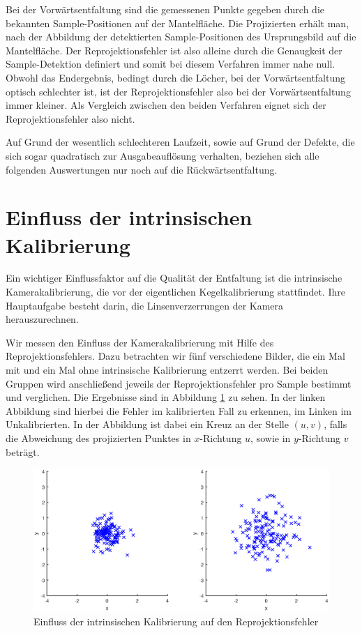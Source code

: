 Bei der Vorwärtsentfaltung sind die gemessenen Punkte gegeben durch die bekannten Sample-Positionen auf der Mantelfläche. Die Projizierten erhält man, nach der Abbildung der detektierten Sample-Positionen des Ursprungsbild auf die Mantelfläche. Der Reprojektionsfehler ist also alleine durch die Genaugkeit der Sample-Detektion definiert und somit bei diesem Verfahren immer nahe null. 
Obwohl das Endergebnis, bedingt durch die Löcher, bei der Vorwärtsentfaltung optisch schlechter ist, ist der Reprojektionsfehler also bei der Vorwärtsentfaltung immer kleiner. 
Als Vergleich zwischen den beiden Verfahren eignet sich der Reprojektionsfehler also nicht.

Auf Grund der wesentlich schlechteren Laufzeit, sowie auf Grund der Defekte, die sich sogar quadratisch zur Ausgabeauflösung verhalten, beziehen sich alle folgenden Auswertungen nur noch auf die Rückwärtsentfaltung. 

\section{Einfluss der intrinsischen Kalibrierung}
Ein wichtiger Einflussfaktor auf die Qualität der Entfaltung ist die intrinsische Kamerakalibrierung, die vor der eigentlichen Kegelkalibrierung stattfindet. Ihre Hauptaufgabe besteht darin, die Linsenverzerrungen der Kamera herauszurechnen. 

Wir messen den Einfluss der Kamerakalibrierung mit Hilfe des Reprojektionsfehlers. Dazu betrachten wir fünf verschiedene Bilder, die ein Mal mit und ein Mal ohne intrinsische Kalibrierung entzerrt werden. Bei beiden Gruppen wird anschließend jeweils der Reprojektionsfehler pro Sample bestimmt und verglichen. Die Ergebnisse sind in Abbildung \ref{fig:influenceCalib} zu sehen. In der linken Abbildung sind hierbei die Fehler im kalibrierten Fall zu erkennen, im Linken im Unkalibrierten. In der Abbildung ist dabei ein Kreuz an der Stelle $(u,v)$, falls die Abweichung des projizierten Punktes in $x$-Richtung $u$, sowie in $y$-Richtung $v$ beträgt. 

\begin{figure}[!htb]
	\centering
	\includegraphics[width=\textwidth]{images/reprojectionErrorReverse.eps}
	\caption{Einfluss der intrinsischen Kalibrierung auf den Reprojektionsfehler}
	\label{fig:influenceCalib}
\end{figure}


